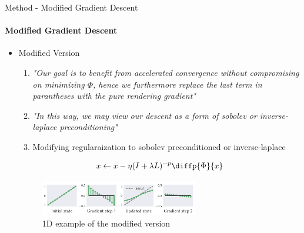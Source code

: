 \documentclass[beamer]{standalone}
\begin{document}
\begin{frame}{Method - Modified Gradient Descent}
    \framesubtitle{Modified Gradient Descent}
    \begin{itemize}
        \item Modified Version
        \begin{enumerate}
            \item \emph{
                "Our goal is to benefit from accelerated convergence without compromising on minimizing $\Phi$, 
                hence we furthermore replace the last term in parantheses with the pure rendering gradient"
            }
            \item \emph{
                "In this way, we may view our descent as a form of sobolev or inverse-laplace preconditioning"
            }
            \item Modifying regularaization to sobolev preconditioned or inverse-laplace
        \end{enumerate}
        
        \begin{equation}
            x \leftarrow x 
            - \eta (I + \lambda L)^{-p} {\diffp{\Phi}{x}}
        \end{equation}
    
        \begin{figure}[t]
            \includegraphics[width=0.65\textwidth]{./figures/method2-figure-4.png}
            \vspace*{-2mm}\caption{1D example of the modified version}
            \centering
        \end{figure}
    
    \end{itemize}
    
\end{frame}
\end{document}

